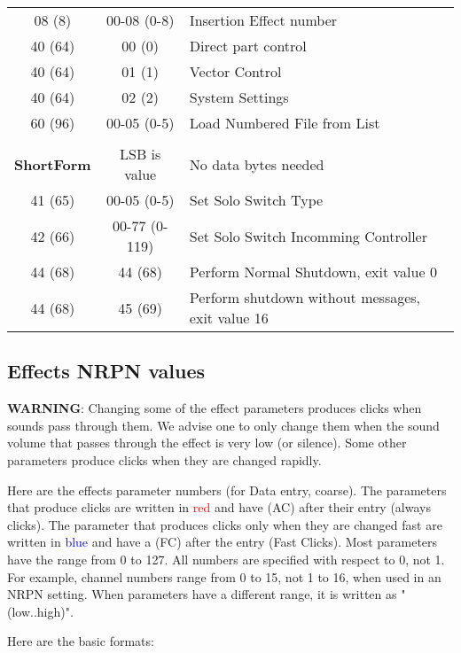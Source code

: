\begin{table}[H]
\begin{tabular}{c c l}
        08 (8) & 00-08 (0-8)& Insertion Effect number \\
        40 (64) & 00 (0) & Direct part control \\
        40 (64) & 01 (1) & Vector Control \\
        40 (64) & 02 (2) & System Settings \\
        60 (96) & 00-05 (0-5) & Load Numbered File from List \\
        \\
    \textbf{ShortForm} &  LSB is value & No data bytes needed \\
        41 (65) & 00-05 (0-5) & Set Solo Switch Type \\
        42 (66) & 00-77 (0-119) & Set Solo Switch Incomming Controller \\
        44 (68) & 44 (68) & Perform Normal Shutdown, exit value 0 \\
        44 (68) & 45 (69) & Perform shutdown without messages, exit value 16 \\
      \end{tabular}
   \end{table}

\subsection{Effects NRPN values}
\label{subsection:effects_nrpn_values}
   \textbf{WARNING}:
   Changing some of the effect parameters produces clicks when sounds pass
   through them.  We advise one to only change them when the sound volume that
   passes through the effect is very low (or silence).  Some other parameters
   produce clicks when they are changed rapidly.

   Here are the effects parameter numbers (for Data entry, coarse).
   The parameters that produce clicks are written in \textcolor{red}{red}
   and have (AC) after their entry (always clicks).
   The parameter that produces clicks only when they are changed fast are
   written in \textcolor{blue}{blue} and have a (FC) after the entry (Fast
   Clicks).
   Most parameters have the range from 0 to 127.  All numbers are specified
   with respect to 0, not 1.  For example, channel numbers range from 0 to 15,
   not 1 to 16, when used in an NRPN setting.
   When parameters have a different range, it is written as "(low..high)".

   Here are the basic formats:

